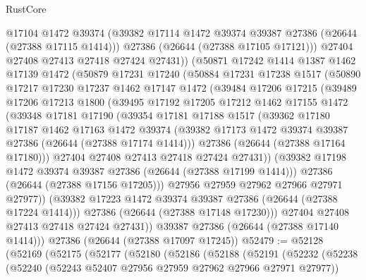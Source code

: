 \begin{lexlean}{RustCore}
\begin{coremodule}
          @17104
          @1472
          @39374
          (@39382 @17114 @1472 @39374 @39387 @27386 (@26644 (@27388 @17115 @1414)))
          @27386
          (@26644 (@27388 @17105 @17121)))
        @27404
        @27408
        @27413
        @27418
        @27424
        @27431))
    (@50871
      @17242
      @1414
      @1387
      @1462
      @17139
      @1472
      (@50879
        @17231
        @17240
        (@50884
          @17231
          @17238
          @1517
          (@50890
            @17217
            @17230
            @17237
            @1462
            @17147
            @1472
            (@39484
              @17206
              @17215
              (@39489
                @17206
                @17213
                @1800
                (@39495
                  @17192
                  @17205
                  @17212
                  @1462
                  @17155
                  @1472
                  (@39348
                    @17181
                    @17190
                    (@39354
                      @17181
                      @17188
                      @1517
                      (@39362
                        @17180
                        @17187
                        @1462
                        @17163
                        @1472
                        @39374
                        (@39382 @17173 @1472 @39374 @39387 @27386 (@26644 (@27388 @17174 @1414)))
                        @27386
                        (@26644 (@27388 @17164 @17180)))
                      @27404
                      @27408
                      @27413
                      @27418
                      @27424
                      @27431))
                  (@39382 @17198 @1472 @39374 @39387 @27386 (@26644 (@27388 @17199 @1414)))
                  @27386
                  (@26644 (@27388 @17156 @17205)))
                @27956
                @27959
                @27962
                @27966
                @27971
                @27977))
            (@39382 @17223 @1472 @39374 @39387 @27386 (@26644 (@27388 @17224 @1414)))
            @27386
            (@26644 (@27388 @17148 @17230)))
          @27404
          @27408
          @27413
          @27418
          @27424
          @27431))
      @39387
      @27386
      (@26644 (@27388 @17140 @1414)))
    @27386
    (@26644 (@27388 @17097 @17245))
@52479 := @52128
    (@52169
      (@52175
        (@52177
          (@52180
            (@52186
              (@52188
                (@52191
                  (@52232
                    (@52238
                      (@52240 (@52243 @52407 @27956 @27959 @27962 @27966 @27971 @27977))

\end{coremodule}
\end{lexlean}
